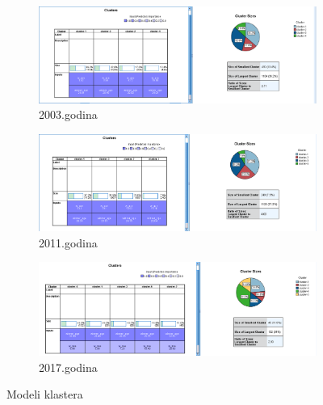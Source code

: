 \documentclass[a4paper]{article}
\begin{document}
\begin{figure}[H]
	\begin{subfigure}[h]{\textwidth}
		\begin{center}
			\includegraphics[scale=0.50]{Klasterovanje/Model_KMeans2003.png}
		\end{center}
		\caption{2003.godina}
		\label{fig:SPSS_Model2003}
	\end{subfigure}

	\vspace{1cm}
	\begin{subfigure}[h]{\textwidth}
		\begin{center}
			\includegraphics[scale=0.50]{Klasterovanje/Model_KMeans2011.png}
		\end{center}
		\caption{2011.godina}
		\label{fig:SPSS_Model2011}
	\end{subfigure}

	\vspace{1cm}
	\begin{subfigure}[h]{\textwidth}
		\begin{center}
			\includegraphics[scale=0.50]{Klasterovanje/Model_KMeans2017.png}
		\end{center}
		\caption{2017.godina}
		\label{fig:SPSS_Model2017}
	\end{subfigure}

	\caption{Modeli klastera}
	\label{ModeliKlastera}
\end{figure}
\end{document}
